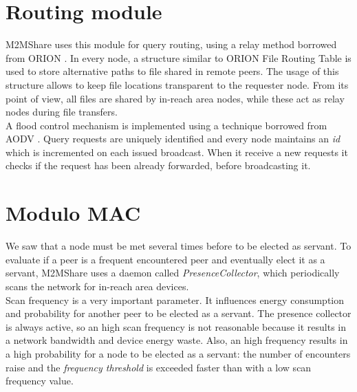 

\section{Routing module}
M2MShare uses this module for query routing, using a relay method borrowed from ORION \cite{orion}. In every node, a structure similar to ORION File Routing Table is used to store alternative paths to file shared in remote peers. The usage of this structure allows to keep file locations transparent to the requester node. From its point of view, all files are shared by in-reach area nodes, while these act as relay nodes during file transfers.\\
A flood control mechanism is implemented using a technique borrowed from AODV \cite{aodv}. Query requests are uniquely identified and every node maintains an \textit{id} which is incremented on each issued broadcast. When it receive a new requests it checks if the request has been already forwarded, before broadcasting it.



\section{Modulo MAC}
\label{descrPresenceCollector}
We saw that a node must be met several times before to be elected as servant. To evaluate if a peer is a frequent encountered peer and eventually elect it as a servant, M2MShare uses a daemon called \textit{PresenceCollector}, which periodically scans the network for in-reach area devices. 
\\

Scan frequency is a very important parameter. It influences energy consumption and probability for another peer to be elected as a servant. The presence collector is always active, so an high scan frequency is not reasonable because it results in a network bandwidth and device energy waste. Also, an high frequency results in a high probability for a node to be elected as a servant: the number of encounters raise and the \textit{frequency threshold} is exceeded faster than with a low scan frequency value.
\\

